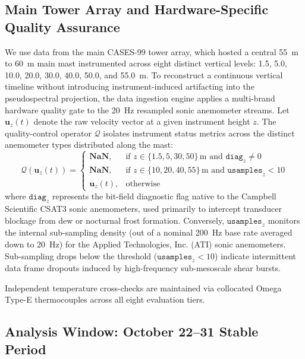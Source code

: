\documentclass[11pt,a4paper]{article}
\begin{document}
\subsection{Main Tower Array and Hardware-Specific Quality Assurance}
We use data from the main CASES-99 tower array, which hosted a central \SI{55}{\meter} to \SI{60}{\meter} main mast instrumented across eight distinct vertical levels: 1.5, 5.0, 10.0, 20.0, 30.0, 40.0, 50.0, and \SI{55.0}{\meter}. To reconstruct a continuous vertical timeline without introducing instrument-induced artifacting into the pseudospectral projection, the data ingestion engine applies a multi-brand hardware quality gate to the 20~Hz resampled sonic anemometer streams. Let $\mathbf{u}_z(t)$ denote the raw velocity vector at a given instrument height $z$. The quality-control operator $\mathcal{Q}$ isolates instrument status metrics across the distinct anemometer types distributed along the mast:
\begin{equation}
\mathcal{Q}\left(\mathbf{u}_z(t)\right) =
\begin{cases}
\mathbf{NaN}, & \text{if } z \in \{1.5, 5, 30, 50\}\,\text{m and } \mathtt{diag}_z \neq 0 \\
\mathbf{NaN}, & \text{if } z \in \{10, 20, 40, 55\}\,\text{m and } \mathtt{usamples}_z < 10 \\
\mathbf{u}_z(t), & \text{otherwise}
\end{cases}
\end{equation}
where $\mathtt{diag}_z$ represents the bit-field diagnostic flag native to the Campbell Scientific CSAT3 sonic anemometers, used primarily to intercept transducer blockage from dew or nocturnal frost formation. Conversely, $\mathtt{usamples}_z$ monitors the internal sub-sampling density (out of a nominal 200~Hz base rate averaged down to 20~Hz) for the Applied Technologies, Inc. (ATI) sonic anemometers. Sub-sampling drops below the threshold ($\mathtt{usamples}_z < 10$) indicate intermittent data frame dropouts induced by high-frequency sub-mesoscale shear bursts.

Independent temperature cross-checks are maintained via collocated Omega Type-E thermocouples across all eight evaluation tiers.

\subsection{Analysis Window: October 22--31 Stable Period}
\end{document}
